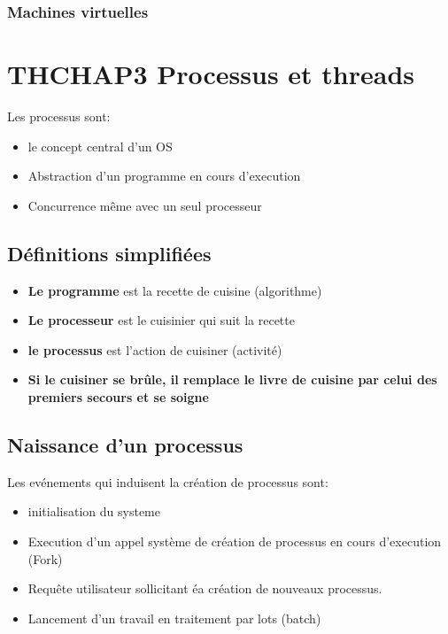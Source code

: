     \subsubsection{Machines virtuelles}




\newpage
\section{THCHAP3 Processus et threads}%

Les processus sont:

\begin{itemize}
    \item le concept central d'un OS
    \item Abstraction d'un programme en cours d'execution
    \item Concurrence même avec un seul processeur
\end{itemize}

\subsection{Définitions simplifiées}
\begin{itemize}
    \item \textbf{Le programme} est la recette de cuisine (algorithme)
    \item \textbf{Le processeur} est le cuisinier qui suit la recette
    \item \textbf{le processus} est l’action de cuisiner (activité)
    \item \textbf{Si le cuisiner se brûle, il remplace le livre de cuisine par celui des premiers secours et se soigne}
\end{itemize}

\subsection{Naissance d'un processus}

Les evénements qui induisent la création de processus sont:
\begin{itemize}
    \item initialisation du systeme
    \item Execution d'un appel système de création de processus en cours d'execution (Fork)
    \item Requête utilisateur sollicitant éa création de nouveaux processus.
    \item Lancement d'un travail en traitement par lots (batch)
\end{itemize}


